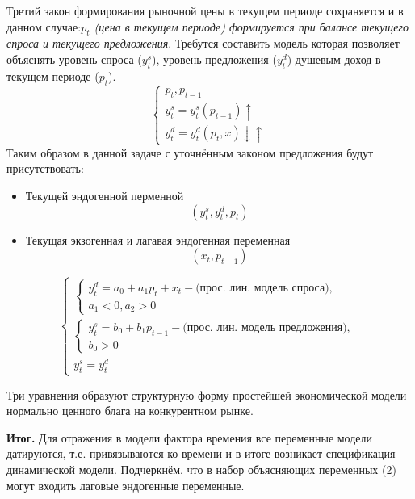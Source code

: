 \documentclass[12pt,a4paper]{article}
\begin{document}
Третий закон формирования рыночной цены в текущем периоде сохраняется и в данном случае:\textit{$p_t$ (цена в текущем периоде) формируется при балансе текущего спроса и текущего предложения}. Требутся составить модель которая позволяет объяснять уровень спроса ($y_t^s$), уровень предложения ($y_t^d$) душевым доход в текущем периоде ($p_t$).
\begin{equation*}
\begin{cases}
p_t, p_{t-1} \\
y_t^s = y_t^s(p_{t-1})\uparrow \\
y_t^d = y_t^d(p_t, x)\downarrow \uparrow
\end{cases}
\end{equation*}
Таким образом в данной задаче с уточнённым законом предложения будут присутствовать:
\begin{itemize}
\item Текущей эндогенной перменной 
\begin{equation}
(y_t^s, y_t^d, p_t)
\end{equation}
\item Текущая экзогенная и лагавая эндогенная переменная
\begin{equation}
(x_t, p_{t - 1})
\end{equation}
\end{itemize}
\begin{equation}
\begin{cases}
\begin{cases}
y_t^d = a_0 + a_1 p_t + x_t - \text{(прос. лин. модель спроса)}, \\
a_1 < 0, a_2 > 0
\end{cases} \\
\begin{cases}
y_t^s = b_0 + b_1 p_{t - 1} - \text{(прос. лин. модель предложения)}, \\
b_0 > 0
\end{cases} \\
y_t^s = y_t^d
\end{cases}
\end{equation}

Три уравнения образуют структурную форму простейшей экономической модели нормально ценного блага на конкурентном рынке.

\textbf{Итог.} Для отражения в модели фактора времения все переменные модели датируются, т.е. привязываются ко времени и в итоге возникает спецификация динамической модели. Подчеркнём, что в набор объясняющих переменных (2) могут входить лаговые эндогенные переменные.
\end{document}
